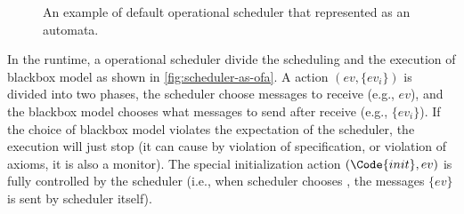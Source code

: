 \begin{figure}
\caption{An example of default operational scheduler that represented as an automata.}
    \label{fig:scheduler-as-ofa}
\end{figure}

In the runtime, a operational scheduler divide the scheduling and the execution of blackbox model as shown in \autoref{fig:scheduler-as-ofa}. A action $(ev, \{ev_i\})$ is divided into two phases, the scheduler choose messages to receive (e.g., $ev$), and the blackbox model chooses what messages to send after receive (e.g., $\{ev_i\}$). If the choice of blackbox model violates the expectation of the scheduler, the execution will just stop (it can cause by violation of specification, or violation of axioms, it is also a monitor). The special initialization action $(\Code{init}, ev)$ is fully controlled by the scheduler (i.e., when scheduler chooses , the messages $\{ev\}$ is sent by scheduler itself).


